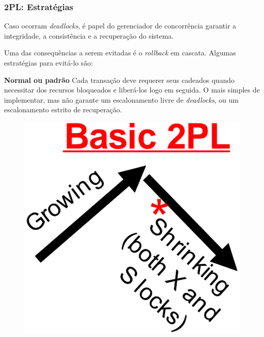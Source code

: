 \documentclass{beamer}
\begin{document}
\begin{frame}
    \frametitle{2PL: Estratégias}
    
    Caso ocorram \emph{deadlocks}, é papel do gerenciador de concorrência garantir a integridade, a consistência e a recuperação do sistema.
    
    \medskip
    Uma das consequências a serem evitadas é o \emph{rollback} em cascata. Algumas estratégias para evitá-lo são:
    
    \medskip
    \begin{block}{\textbf{Normal ou padrão}}
        Cada transação deve requerer seus cadeados quando necessitar dos recursos bloqueados e liberá-los logo em seguida. O mais simples de implementar, mas não garante um escalonamento livre de \emph{deadlocks}, ou um escalonamento estrito de recuperação.

        \medskip
        \begin{figure}
            \includegraphics[width=0.8\linewidth]{basic2pl.png}
        \end{figure}
    \end{block}
\end{frame}
\end{document}

